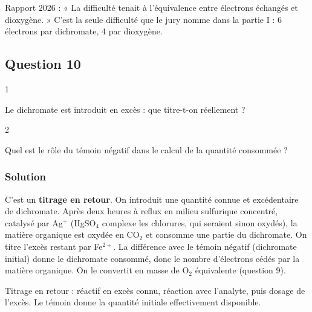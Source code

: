 \documentclass[11pt,a4paper]{article}
\begin{document}
\begin{jury}

Rapport 2026 : « La difficulté tenait à l'équivalence entre électrons échangés et dioxygène. » C'est la seule difficulté que le jury nomme dans la partie I : 6 électrons par dichromate, 4 par dioxygène.

\end{jury}

\hypertarget{question-10}{%
\subsection{Question 10}\label{question-10}}

\begin{indication}{1}

Le dichromate est introduit en excès : que titre-t-on réellement ?

\end{indication}

\begin{indication}{2}

Quel est le rôle du témoin négatif dans le calcul de la quantité consommée ?

\end{indication}

\hypertarget{solution-9}{%
\subsubsection{Solution}\label{solution-9}}

C'est un \textbf{titrage en retour}. On introduit une quantité connue et excédentaire de dichromate. Après deux heures à reflux en milieu sulfurique concentré, catalysé par Ag\(^+\) (HgSO\(_4\) complexe les chlorures, qui seraient sinon oxydés), la matière organique est oxydée en CO\(_2\) et consomme une partie du dichromate. On titre l'excès restant par Fe\(^{2+}\). La différence avec le témoin négatif (dichromate initial) donne le dichromate consommé, donc le nombre d'électrons cédés par la matière organique. On le convertit en masse de O\(_2\) équivalente (question 9).

\begin{methode}

Titrage en retour : réactif en excès connu, réaction avec l'analyte, puis dosage de l'excès. Le témoin donne la quantité initiale effectivement disponible.

\end{methode}
\end{document}
